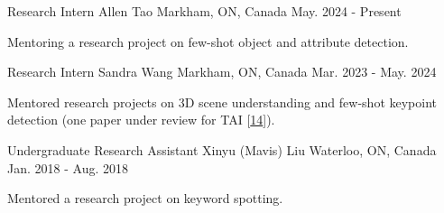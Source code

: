 \begin{cventries}
\cventry
{Research Intern} %
{Allen Tao} %
{Markham, ON, Canada} %
{May. 2024 - Present} %
{ %
\begin{cvitems}
\item {Mentoring a research project on few-shot object and attribute detection.}
\end{cvitems}
}
\cventry
{Research Intern} %
{Sandra Wang} %
{Markham, ON, Canada} %
{Mar. 2023 - May. 2024} %
{ %
\begin{cvitems}
\item {Mentored research projects on 3D scene understanding and few-shot keypoint detection (one paper under review for TAI [\hyperlink{LAM:TAI}{14}]).}
\end{cvitems}
}
\cventry
{Undergraduate Research Assistant} %
{Xinyu (Mavis) Liu} %
{Waterloo, ON, Canada} %
{Jan. 2018 - Aug. 2018} %
{ %
\begin{cvitems}
\item {Mentored a research project on keyword spotting.}
\end{cvitems}
}
\end{cventries}
